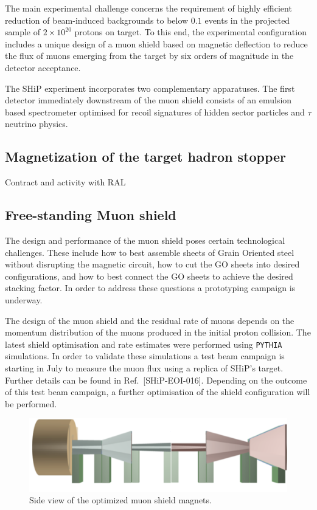 The main experimental challenge concerns the requirement of highly efficient reduction of beam-induced backgrounds to below $0.1$ events in the projected sample of $2\times 10^{20}$ protons on target. To this end, the experimental configuration includes a unique design of a muon shield based on magnetic deflection to reduce the flux of muons emerging from the target by six orders of magnitude in the detector acceptance. 

The SHiP experiment incorporates two complementary apparatuses. The first detector
immediately downstream of the muon shield consists of an emulsion based spectrometer optimised for recoil signatures of hidden sector particles and $\tau$ neutrino physics.


\subsection{Magnetization of the target hadron stopper}
Contract and activity with RAL

\subsection{Free-standing Muon shield}

The design and performance of the muon shield poses certain technological challenges. These 
include how to best assemble sheets of Grain Oriented steel without disrupting the magnetic 
circuit, how to cut the GO sheets into desired configurations, and how to best connect the 
GO sheets to achieve the desired stacking factor. In order to address these questions a 
prototyping campaign is underway.

The design of the muon shield and the residual rate of muons depends on the momentum 
distribution of the muons produced in the initial proton collision. The latest shield 
optimisation and rate estimates were performed using \texttt{PYTHIA} simulations. In order 
to validate these simulations a test beam campaign is starting in July to measure the muon 
flux using a replica of SHiP's target. Further details can be found in Ref.~[SHiP-EOI-016]. 
Depending on the outcome of this test beam campaign, a further optimisation of the 
shield configuration will be performed.

\begin{figure}[thbp]
\centering
\includegraphics[width=1.0\columnwidth]{figs/BeamLine/shield_YZview.png}
\caption{Side view of the optimized muon shield magnets.}
\label{fig:shieldSideView}
\end{figure}

